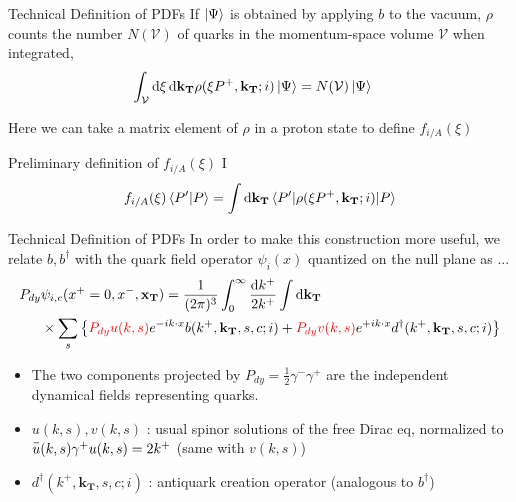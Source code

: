 \documentclass[aspectratio=169,xcolor=dvipsnames]{beamer}
\newcommand{\overbar}[1]{
	\mkern 1.5mu \overline{\mkern-1.5mu\raisebox{0pt}[\dimexpr\height+0.5mm\relax]{$#1$}\mkern-1.5mu}\mkern 1.5mu
}
\newcommand*\dif{\mathop{}\!\mathrm{d}}
\begin{document}
\begin{frame}{Technical Definition of PDFs}
	If $\ket{\Psi}$ is obtained by applying $b$ to the vacuum, $\rho$ counts the number $N(\mathcal{V})$ of quarks in the momentum-space volume $\mathcal{V}$ when integrated,
	\begin{align*}
		\int_\mathcal{V} \dif\xi \dif \mathbf{k_T} \rho(&\xi P^+,\mathbf{k_T};i) \ket{\Psi} = N(\mathcal{V}) \ket{\Psi}
	\end{align*}
	
	Here we can take a matrix element of $\rho$ in a proton state to define $f_{i/A}(\xi)$\vskip0.1in
	\begin{block}{Preliminary definition of $f_{i/A}(\xi)$ I}
		\begin{align*}
			f_{i/A}(\xi) \braket{P'|P} = \int \dif\mathbf{k_T} \braket{P'|\rho(\xi P^+,\mathbf{k_T};i)|P}\\
		\end{align*}
	\end{block}
\end{frame}

\begin{frame}{Technical Definition of PDFs}
	In order to make this construction more useful, we relate $b,b^\dagger$ with the quark field operator $\psi_i(x)$ quantized on the null plane as ...
	\begin{align*}
		P_{dy}&\psi_{i,c}(x^+=0,x^-,\mathbf{x_T}) = \frac{1}{(2\pi)^3} \int_{0}^{\infty} \frac{\dif k^+}{2k^+} \int \dif\mathbf{k_T} \\
		&\times \sum_s \left\{ \begingroup \color{red} P_{dy}u(k,s)\endgroup e^{-ik\cdot x}b(k^+, \mathbf{k_T},s,c;i)+\begingroup \color{red}P_{dy}v(k,s) \endgroup e^{+ik\cdot x}d^\dagger(k^+, \mathbf{k_T},s,c;i)\right\}
	\end{align*}
	\begin{itemize}
		\item The \alert{two components} projected by $P_{dy}=\frac{1}{2}\gamma^-\gamma^+$ are the independent dynamical fields representing quarks. 
		\item $u(k,s),v(k,s)$ : usual spinor solutions of the free Dirac eq, normalized to $\overbar{u}(k,s)\gamma^+ u(k,s)=2k^+$ (same with $v(k,s)$)
		\item $d^\dagger(k^+, \mathbf{k_T},s,c;i)$ : antiquark creation operator (analogous to $b^\dagger$)
	\end{itemize}
\end{frame}
\end{document}
